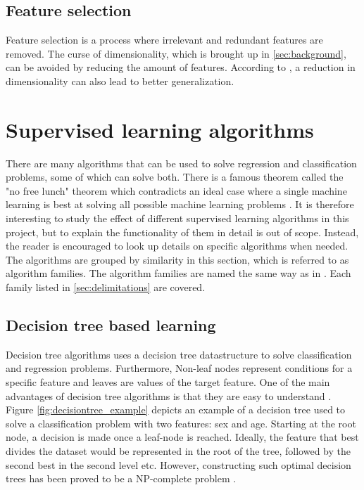 	\subsection{Feature selection} \label{sec:feature_selection}
		Feature selection is a process where irrelevant and redundant features are removed. The curse of dimensionality, which is brought up in \ref{sec:background}, can be avoided by reducing the amount of features. According to \cite{ARTICLE:10}, a reduction in dimensionality can also lead to better generalization.  
	


	
\section{Supervised learning algorithms} \label{sec:supervised_algorithms}
	There are many algorithms that can be used to solve regression and classification problems, some of which can solve both. There is a famous theorem called the "no free lunch" theorem which contradicts an ideal case where a single machine learning is best at solving all possible machine learning problems \cite{ARTICLE:5}.  It is therefore interesting to study the effect of different supervised learning algorithms in this project, but to explain the functionality of them in detail is out of scope. Instead, the reader is encouraged to look up details on specific algorithms when needed. The algorithms are grouped by similarity in this section, which is referred to as algorithm families. The algorithm families are named the same way as in \cite{BOOK:6}. Each family listed in \ref{sec:delimitations} are covered. 

	\subsection{Decision tree based learning}
		Decision tree algorithms uses a decision tree datastructure to solve classification and regression problems. Furthermore, Non-leaf nodes represent conditions for a specific feature and leaves are values of the target feature. One of the main advantages of decision tree algorithms is that they are easy to understand \cite{ARTICLE:7}. Figure \ref{fig:decisiontree_example} depicts an example of a decision tree used to solve a classification problem with two features: sex and age. Starting at the root node, a decision is made once a leaf-node is reached. Ideally, the feature that best divides the dataset would be represented in the root of the tree, followed by the second best in the second level etc. However, constructing such optimal decision trees has been proved to be a NP-complete problem \cite{ARTICLE:11}. 

